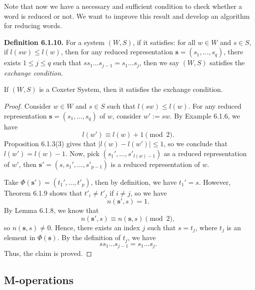 \documentclass[../main.tex]{subfiles}
\begin{document}
Note that now we have a necessary and sufficient condition to check whether a word is reduced or not. We want to improve this result and develop an algorithm for reducing words. 

\begin{definition}
    \noindent \textbf{Definition 6.1.10.} For a system $(W, S)$, if it satisfies: for all $w \in W$ and $s \in S$, if $l(sw) \leq l(w)$, then for any reduced representation $\mathbf{s} = (s_1, \dots, s_q)$, there exists $1 \leq j \leq q$ such that $s s_1 \dots s_{j-1} = s_1 \dots s_j$, then we say $(W, S)$ satisfies the \textit{exchange condition}.
\end{definition}

\begin{theorem}
    If $(W, S)$ is a Coxeter System, then it satisfies the exchange condition.
    \begin{proof}
        Consider $w \in W$ and $s \in S$ such that $l(sw) \leq l(w)$. For any reduced representation $\mathbf{s} = (s_1, \dots, s_q)$ of $w$, consider $w' := sw$. By Example 6.1.6, we have
        \[
        l(w') \equiv l(w) + 1 \pmod{2}.
        \]
        Proposition 6.1.3(3) gives that $|l(w) - l(w')| \leq 1$, so we conclude that $l(w') = l(w) - 1$. Now, pick $(s_1', \dots, s'_{l(w)-1})$ as a reduced representation of $w'$, then $\mathbf{s'} = (s, s_1', \dots, s'_{p-1})$ is a reduced representation of $w$. 

        Take $\Phi(\mathbf{s'}) = (t_1', \dots, t'_p)$, then by definition, we have $t_1' = s$. However, Theorem 6.1.9 shows that $t'_i \neq t'_j$ if $i \neq j$, so we have
        \[
        n(\mathbf{s'}, s) = 1.
        \]
        By Lemma 6.1.8, we know that
        \[
        n(\mathbf{s'}, s) \equiv n(\mathbf{s}, s) \pmod{2},
        \]
        so $n(\mathbf{s}, s) \neq 0$. Hence, there exists an index $j$ such that $s = t_j$, where $t_j$ is an element in $\Phi(\mathbf{s})$. By the definition of $t_j$, we have
        \[
        s s_1 \dots s_{j-1} = s_1 \dots s_j.
        \]
        Thus, the claim is proved.
    \end{proof}
\end{theorem}

\subsection{M-operations}
\end{document}
